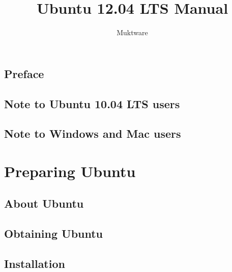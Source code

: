 \documentclass[10pt,a4paper,oneside,final,titlepage]{book}
\author{Muktware}
\title{Ubuntu 12.04 LTS Manual}
\begin{document}




\newpage
\thispagestyle{empty}
\mbox{}
\pagestyle{fancy}
	\fancyhf{}
	\lhead{}
	\rhead{}
	\cfoot{\thepage}
	\renewcommand{\headrulewidth}{0pt}

\chapter*{Preface} 


\setcounter{page}{1}
\tableofcontents 
\clearpage

\pagestyle{fancy}
	\fancyhf{}
	\fancyheadoffset{0.3cm}
	\lhead{\nouppercase \leftmark}
	\cfoot{\thepage}
	\renewcommand{\chaptermark}[1]{\markboth{#1}{}}
	\renewcommand{\headrulewidth}{0pt}

%

\chapter{Note to Ubuntu 10.04 LTS users}


\chapter{Note to Windows and Mac users} \label{chap:other-users}


\part{Preparing Ubuntu}

\chapter{About Ubuntu} \label{sect:about-ubuntu}


\chapter{Obtaining Ubuntu} \label{sect:obtain_ubuntu}


\chapter{Installation} \label{chap:install}

\end{document}
